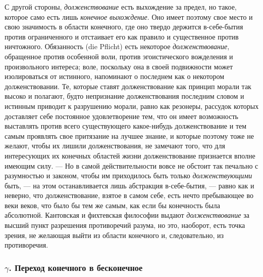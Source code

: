 С другой стороны, {\em долженствование} есть выхождение
за предел, но такое, которое само есть лишь
{\em конечное выхождение}. Оно имеет поэтому свое место
и свою значимость в области конечного, где оно твердо держится в-себе-бытия
против ограниченного и отстаивает его как правило и существенное против
ничтожного. Обязанность (die Pflicht) есть некоторое
{\em долженствование}, обращенное против особенной
воли, против эгоистического вожделения и произвольного интереса; воле,
поскольку она в своей подвижности может изолироваться от истинного,
напоминают о последнем как о некотором долженствовании. Те, которые ставят
долженствование как принцип морали так высоко и полагают, будто непризнание
долженствования последним словом и истинным приводит к разрушению морали,
равно как резонеры, рассудок которых доставляет себе постоянное
удовлетворение тем, что он имеет возможность выставлять против всего
существующего какое-нибудь долженствование и тем самым проявлять свое
притязание на лучшее знание, и которые поэтому тоже не желают, чтобы их лишили
долженствования, не замечают того, что для интересующих их конечных
областей жизни долженствование признается вполне имеющим силу. — Но в самой
действительности вовсе не обстоит так печально с разумностью и законом,
чтобы им приходилось быть только {\em долженствующими}
быть, — на этом останавливается лишь абстракция в-себе-бытия, — равно как и
неверно, что долженствование, взятое в самом себе, есть нечто пребывающее
во веки веков, что было бы тем же самым, как если бы конечность была
абсолютной. Кантовская и фихтевская философии выдают
{\em долженствование} за высший пункт разрешения
противоречий разума, но это, наоборот, есть точка зрения, не желающая выйти
из области конечного и, следовательно, из противоречия.

\subsubsection[$\gamma $. Переход конечного в бесконечное]{$\gamma $. Переход конечного в бесконечное}

